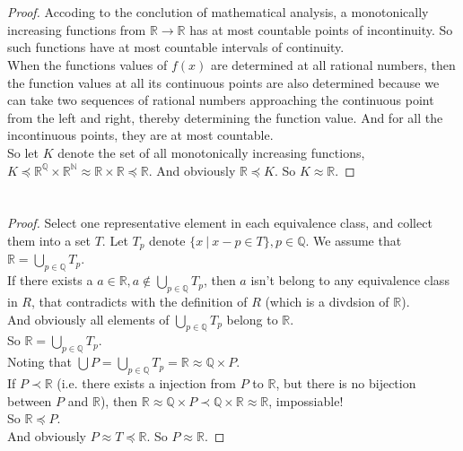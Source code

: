 \documentclass{article}
\newcommand{\RR}{\mathbb{R}}
\newcommand{\NN}{\mathbb{N}}
\newcommand{\QQ}{\mathbb{Q}}
\begin{document}
\section{}

\begin{proof}
    Accoding to the conclution of mathematical analysis, a monotonically increasing functions from $\RR \to \RR$ has at most countable points of incontinuity. So such functions have at most countable intervals of continuity. \\
    When the functions values of $f(x)$ are determined at all rational numbers, then the function values at all its continuous points are also determined because we can take two sequences of rational numbers approaching the continuous point from the left and right, thereby determining the function value. And for all the incontinuous points, they are at most countable. \\
    So let $K$ denote the set of all monotonically increasing functions, $K \preceq \RR^\QQ \times \RR^\NN \approx \RR \times \RR \preceq \RR$. And obviously $\RR \preceq K$. So $K \approx \RR$.
\end{proof}

\section{}

\begin{proof}
    Select one representative element in each equivalence class, and collect them into a set $T$. Let $T_p$ denote $\{x\ |\ x - p \in T\}, p \in \QQ$. We assume that $\RR = \bigcup_{p \in \QQ}T_p$. \\
    If there exists a $a \in \RR, a \notin \bigcup_{p \in \QQ}T_p$, then $a$ isn't belong to any equivalence class in $R$, that contradicts with the definition of $R$ (which is a divdsion of $\RR$). \\
    And obviously all elements of $\bigcup_{p \in \QQ}T_p$ belong to $\RR$. \\
    So $\RR = \bigcup_{p \in \QQ}T_p$. \\
    Noting that $\bigcup P = \bigcup_{p \in \QQ}T_p = \RR \approx \QQ \times P$. \\
    If $P \prec \RR$ (i.e. there exists a injection from $P$ to $\RR$, but there is no bijection between $P$ and $\RR$), then $\RR \approx \QQ \times P \prec \QQ \times \RR \approx \RR$, impossiable! \\
    So $\RR \preceq P$. \\
    And obviously $P \approx T \preceq \RR$. So $P \approx \RR$.
\end{proof}
\end{document}
